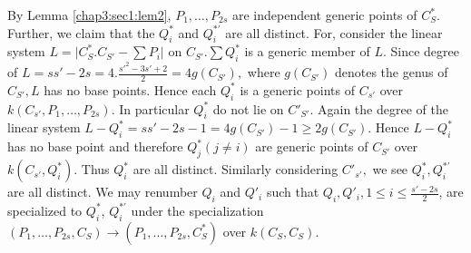 By Lemma \ref{chap3:sec1:lem2}, $P_{1}, \ldots , P_{2s}$ are
independent generic points of  
$C^{*}_{S}$. Further, we claim that the $Q^{*}_{i} $ and $Q^{*'}_{i} $
are all distinct. For, consider the linear system $L = 
\big| C^{*}_{S} . C_{S'} - \sum P_{i}\big|$ on $C_{S'}. \sum
Q^{*}_{i} $ is a generic member of $L$. Since degree of $L =
ss' - 2s = 4. \frac{s'^{2} -3s' +2}{2} = 4g(C_{S'}), $ where $
g(C_{S'}) $ denotes the genus of $C_{S'}, L $ has no base
points. Hence each $Q^{*}_{i} $ is a generic points of $C_{s'} $
over $k(C_{s'}, P_{1}, \ldots, P_{2s})$. In particular $Q^{*}_{i}$  do
not lie on $C'_{S'}$. Again 
the degree of the linear system $L -Q^{*}_{i} = ss' - 2s-1 =
4g(C_{S'}) - 1 \geq 2g (C_{S'})$. Hence $L - Q^{*}_{i}$ has no base
point and therefore $Q^{*}_{j} (j \neq i) $ are generic points of $
C_{S'} $ over $k(C_{s'}, Q^{*}_{i})$. Thus $Q^{*}_{i}$ are all
distinct. Similarly considering $C'_{s'}, $ we see 
$Q^{*}_{i},Q^{*'}_{i}$ are all distinct. We may renumber $Q_{i} $
and $Q'_{i} $ such that $Q_{i}, Q'_{i}, 1 \leq i \leq \frac{s' -
 2s}{2}$, are specialized to $Q^{*}_{i}$, $Q^{*'}_{i}$ under the
specialization $(P_{1}, \ldots , P_{2s}, C_{S}) \rightarrow (P_{1},
\ldots , P_{2s}, C^{*}_{S})$ over $k(C_{S},C_{S})$.  

